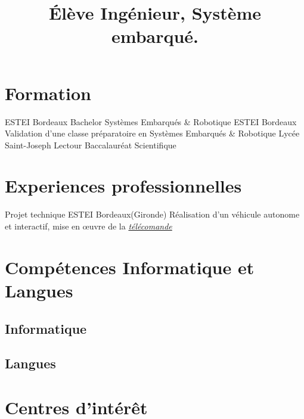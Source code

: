 \documentclass[11pt,a4paper,sans]{moderncv}
\title{Élève Ingénieur, Système embarqué.}
\begin{document}
\maketitle
\section{Formation}
 {ESTEI} {Bordeaux} {Bachelor Systèmes Embarqués \& Robotique} {} {}
 {ESTEI} {Bordeaux} {Validation d'une classe préparatoire en Systèmes Embarqués \& Robotique} {} {}
 {Lycée Saint-Joseph} {Lectour} {Baccalauréat Scientifique} {} {} 
\section{Experiences professionnelles }
 {Projet technique} {ESTEI} {Bordeaux(Gironde)} {Réalisation d'un véhicule autonome et interactif, mise en œuvre de la \href{https://github.com/Coutanthomas/B2_Project-report-}{\textit{télécomande}}}
{} 
\section{Compétences Informatique et Langues}
\subsection{Informatique}
\subsection{Langues}
\section{Centres d'intérêt}
\end{document}
